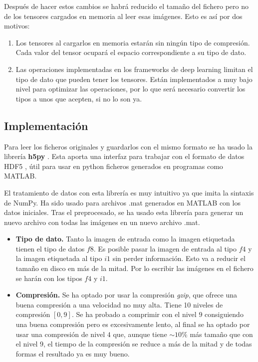 Después de hacer estos cambios se habrá reducido el tamaño del fichero pero no de los tensores cargados en memoria al leer esas imágenes. Esto es así por dos motivos:
\begin{enumerate}
\item Los tensores al cargarlos en memoria estarán sin ningún tipo de compresión. Cada valor del tensor ocupará el espacio correspondiente a su tipo de dato.
\item Las operaciones implementadas en los frameworks de deep learning limitan el tipo de dato que pueden tener los tensores. Están implementados a muy bajo nivel para optimizar las operaciones, por lo que será necesario  convertir los tipos a unos que acepten, si no lo son ya.
\end{enumerate}

\subsection{Implementación}\label{subsec:disk_problem_implementation}

Para leer los ficheros originales y guardarlos con el mismo formato se ha usado la librería  \textbf{h5py} \cite{Collette2013}. Esta aporta una interfaz para trabajar con el formato de datos HDF5 \cite{HDFGroup20002010}, útil para usar en python ficheros generados en programas como MATLAB.

El tratamiento de datos con esta librería es muy intuitivo ya que imita la sintaxis de NumPy. Ha sido usado para archivos .mat generados en MATLAB con los datos iniciales. Tras el preprocesado, se ha usado esta librería para generar un nuevo archivo con todas las imágenes en un nuevo archivo .mat.

\begin{itemize}
\item \textbf{Tipo de dato.} Tanto la imagen de entrada como la imagen etiquetada tienen el tipo de datos $f8$. Es posible pasar la imagen de entrada al tipo $f4$ y la imagen etiquetada al tipo $i1$ sin perder información. Esto va a reducir el tamaño en disco en más de la mitad. Por lo escribir las imágenes en el fichero se harán con los tipos $f4$ y $i1$.
\item \textbf{Compresión.} Se ha optado por usar la compresión \textit{gzip}, que ofrece una buena compresión a una velocidad no muy alta. Tiene 10 niveles de compresión $[0,9]$. Se ha probado a comprimir con el nivel $9$ consiguiendo una buena compresión pero es excesivamente lento, al final se ha optado por usar una compresión de nivel $4$ que, aunque tiene $\sim 10\%$ más tamaño que con el nivel $9$, el tiempo de la compresión se reduce a más de la mitad y de todas formas el resultado ya es muy bueno.
\end{itemize}

